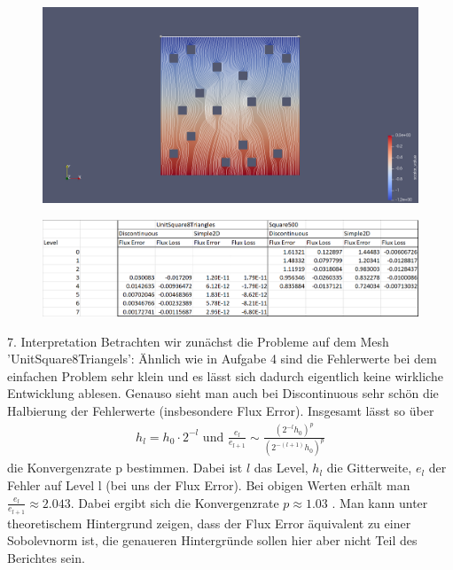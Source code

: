 \documentclass[12pt,a4paper]{scrartcl}
\numberwithin{equation}{section}
\begin{document}
\begin{enumerate}[label=(\roman*)]
\begin{figure}[H]
	\centering
\includegraphics[width=\textwidth]{../Problem_DiscontinousMesh_Square500level_4/blub.png} 
\end{figure}



\begin{figure}[H]
	\centering
\includegraphics[width=\textwidth]{../Aufgabe6/Aufgabe6Tabelle.png}
\end{figure}

7. Interpretation \newline
Betrachten wir zunächst die Probleme auf dem Mesh 'UnitSquare8Triangels': \newline
Ähnlich wie in Aufgabe 4 sind die Fehlerwerte bei dem einfachen Problem sehr klein und es lässt sich dadurch eigentlich keine wirkliche Entwicklung ablesen. Genauso sieht man auch bei Discontinuous sehr schön die Halbierung der Fehlerwerte (insbesondere Flux Error). Insgesamt lässt so über 
\begin{align*}
h_l = h_0 \cdot 2^{-l} \text{ und } \frac{e_l}{e_{l+1}} \sim \frac{(2^{-l}h_0)^{p}}{(2^{-(l+1)}h_0)^{p}}
\end{align*}
die Konvergenzrate p bestimmen. Dabei ist $l$ das Level, $h_l$ die Gitterweite, $e_l$ der Fehler auf Level l (bei uns der Flux Error). 
Bei obigen Werten erhält man $ \frac{e_l}{e_{l+1}} \approx 2.043 $. \newline
Dabei ergibt sich die Konvergenzrate $p \approx 1.03$ .
Man kann unter theoretischem Hintergrund zeigen, dass der Flux Error äquivalent zu einer Sobolevnorm ist, die genaueren Hintergründe sollen hier aber nicht Teil des Berichtes sein.


\end{enumerate}
\end{document}

